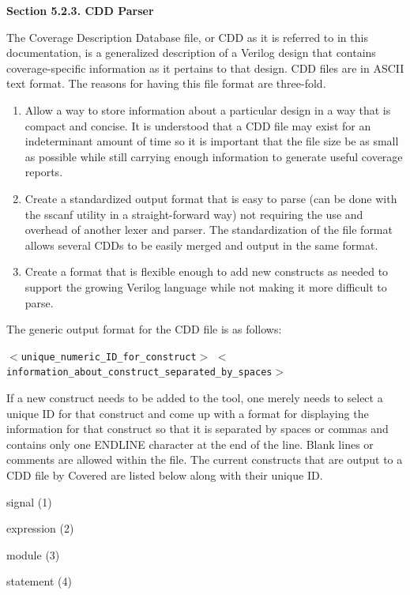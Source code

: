 \begin{Desc}
\item[{\bf Section 5.2.3.  CDD Parser}]\par
 The Coverage Description Database file, or CDD as it is referred to in this documentation, is a generalized description of a Verilog design that contains coverage-specific information as it pertains to that design. CDD files are in ASCII text format. The reasons for having this file format are three-fold.

\begin{enumerate}
\item 
Allow a way to store information about a particular design in a way that is compact and concise. It is understood that a CDD file may exist for an indeterminant amount of time so it is important that the file size be as small as possible while still carrying enough information to generate useful coverage reports.\item 
Create a standardized output format that is easy to parse (can be done with the sscanf utility in a straight-forward way) not requiring the use and overhead of another lexer  and parser. The standardization of the file format allows several CDDs to be easily merged and output in the same format.\item 
Create a format that is flexible enough to add new constructs as needed to support the growing Verilog language while not making it more difficult to parse.\end{enumerate}
\end{Desc}


 The generic output format for the CDD file is as follows:

 {\tt $<$unique\_\-numeric\_\-ID\_\-for\_\-construct$>$} {\tt $<$information\_\-about\_\-construct\_\-separated\_\-by\_\-spaces$>$}

 If a new construct needs to be added to the tool, one merely needs to select a unique ID for that construct and come up with a format for displaying the information for that construct so that it is separated by spaces or commas and contains only one ENDLINE character at the end of the line. Blank lines or comments are allowed within the file. The current constructs that are output to a CDD file by Covered are listed below along with their unique ID.

\begin{CompactItemize}
\item 
signal (1)\item 
expression (2)\item 
module (3)\item 
statement (4)\end{CompactItemize}


